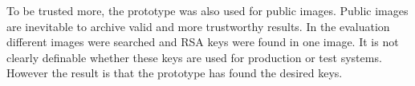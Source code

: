 To be trusted more, the prototype was also used for public images. Public images are inevitable to archive valid and more trustworthy results. In the evaluation different images were searched and RSA keys were found in one image. It is not clearly definable whether these keys are used for production or test systems. However the result is that the prototype has found the desired keys.





